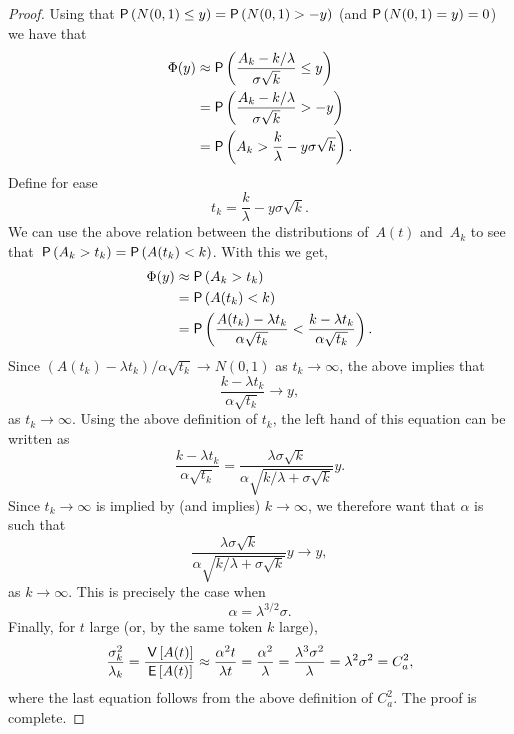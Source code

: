 \begin{proof}
Using that $\P{N(0,1) \leq y} =
\P{N(0,1) > -y}$ (and $\P{N(0,1)=y} = 0$) we have that
%
\begin{align*}
\Phi(y) &\approx \P{\frac{A_k - k/\lambda}{\sigma \sqrt k }\leq y} \\
        &= \P{\frac{A_k - k/\lambda}{\sigma \sqrt k} >  -y} \\
        &=  \P{A_k >  \frac k\lambda - y \sigma \sqrt k}.
\end{align*}
Define for ease
\begin{equation*}
t_k = \frac{k}\lambda - y \sigma \sqrt k.
\end{equation*}
We can use the above relation between the distributions of~$A(t)$
and~$A_k$ to see that~$\P{A_k >t_k } = \P{A(t_k) <k}$. With this we
get,
\begin{align*}
\Phi(y)
        &\approx  \P{A_k >  t_k } \\
        &=  \P{A(t_k) <  k } \\
        &=  \P{\frac{A(t_k) - \lambda t_k}{\alpha \sqrt{t_k}} < 
\frac{k-\lambda t_k}{\alpha \sqrt{t_k}}}.
\end{align*}
Since $(A(t_k) - \lambda t_k)/ \alpha \sqrt{t_k} \to N(0,1)$
as $t_k \to \infty$, the above implies that
\begin{equation*}
\frac{k-\lambda t_k}{\alpha \sqrt{t_k}} \to y,
\end{equation*}
as $t_k \to \infty$.  Using the above definition of $t_k$, the left
hand of this equation can be written as
\begin{equation*}
\frac{k-\lambda t_k}{\alpha \sqrt{t_k}} =
\frac{\lambda \sigma \sqrt k }{\alpha \sqrt{k/\lambda + \sigma\sqrt k}} y.
\end{equation*}
Since $t_k \to \infty$ is implied by (and implies)
$k\to\infty$, we therefore want that $\alpha$ is such that
\begin{equation*}
\frac{\lambda \sigma \sqrt k }{\alpha \sqrt{k/\lambda + \sigma\sqrt k}} y \to y,
\end{equation*}
as $k\to\infty$. This is precisely the case when
\begin{equation*}
\alpha = \lambda^{3/2}\sigma.
\end{equation*}
Finally, for $t$ large (or, by the same token $k$ large),
\begin{equation*}
\frac{\sigma_k^2}{\lambda_k} = \frac{\,\mathsf{V}\left[A(t)\right]}{\,\mathsf{E}\left[A(t)\right]} \approx \frac{\alpha^2 t}{\lambda t} 
= \frac{\alpha^2}{\lambda} = \frac{\lambda^3\sigma^2}{\lambda} = \lambda^2 \sigma^2 = C_a^2,
\end{equation*}
where the last equation follows from the above definition of $C_a^2$.
The proof is complete.
\end{proof}








